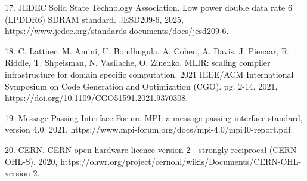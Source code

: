\documentclass[12pt]{article}
\begin{document}
17. JEDEC Solid State Technology Association. Low power double data rate 6 (LPDDR6) SDRAM standard. JESD209-6, 2025, https:/\allowbreak{}/\allowbreak{}www.jedec.org/\allowbreak{}standards-documents/\allowbreak{}docs/\allowbreak{}jesd209-6.

18. C. Lattner, M. Amini, U. Bondhugula, A. Cohen, A. Davis, J. Pienaar, R. Riddle, T. Shpeisman, N. Vasilache, O. Zinenko. MLIR: scaling compiler infrastructure for domain specific computation. 2021 IEEE/\allowbreak{}ACM International Symposium on Code Generation and Optimization (CGO). pg. 2-14, 2021, https:/\allowbreak{}/\allowbreak{}doi.org/\allowbreak{}10.1109/\allowbreak{}CGO51591.2021.9370308.

19. Message Passing Interface Forum. MPI: a message-passing interface standard, version 4.0. 2021, https:/\allowbreak{}/\allowbreak{}www.mpi-forum.org/\allowbreak{}docs/\allowbreak{}mpi-4.0/\allowbreak{}mpi40-report.pdf.

20. CERN. CERN open hardware licence version 2 - strongly reciprocal (CERN-OHL-S). 2020, https:/\allowbreak{}/\allowbreak{}ohwr.org/\allowbreak{}project/\allowbreak{}cernohl/\allowbreak{}wikis/\allowbreak{}Documents/\allowbreak{}CERN-OHL-version-2.
\endgroup
\end{document}
